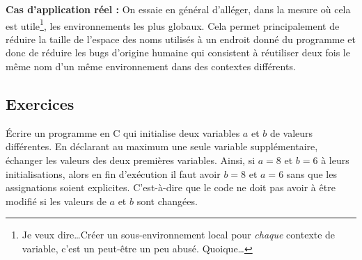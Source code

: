 \documentclass[../../../main.tex]{subfiles}
\begin{document}
\textbf{Cas d'application réel :} On essaie en général d'alléger, dans la mesure où cela est utile\footnote{Je veux dire\dots Créer un sous-environnement local pour \textit{chaque} contexte de variable, c'est un peut-être un peu abusé. Quoique\dots}, les environnements les plus globaux. Cela permet principalement de réduire la taille de l'espace des noms utilisés à un endroit donné du programme et donc de réduire les bugs d'origine humaine qui consistent à réutiliser deux fois le même nom d'un même environnement dans des contextes différents.
\subsection{Exercices}
 Écrire un programme en C qui initialise deux variables $a$ et $b$ de valeurs différentes. En déclarant au maximum une seule variable supplémentaire, échanger les valeurs des deux premières variables. Ainsi, si $a = 8$ et $b = 6$ à leurs initialisations, alors en fin d'exécution il faut avoir $b = 8$ et $a = 6$ sans que les assignations soient explicites. C'est-à-dire que le code ne doit pas avoir à être modifié si les valeurs de $a$ et $b$ sont changées.
\end{document}
